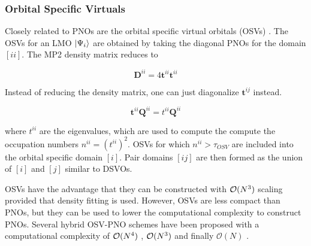 

\subsubsection*{Orbital Specific Virtuals}

Closely related to PNOs are the orbital specific virtual orbitals (OSVs) \cite{Yan2011}. The OSVs for an LMO $\ket{\Psi_i}$ are obtained by taking the diagonal PNOs for the domain $[ii]$. The MP2 density matrix reduces to

\begin{equation}
\mathbf{D}^{ii} = 4 \mathbf{t}^{ii} \mathbf{t}^{ii}
\end{equation}

\noindent Instead of reducing the density matrix, one can just diagonalize $\mathbf{t}^{ij}$ instead. 

\begin{equation}
\mathbf{t}^{ii} \mathbf{Q}^{ii} = t^{ii} \mathbf{Q}^{ii}
\end{equation}

\noindent where $t^{ii}$ are the eigenvalues, which are used to compute the compute the occupation numbers $n^{ii} = \left( t^{ii} \right)^2$. OSVs for which $n^{ii} > \tau_{OSV}$ are included into the orbital specific domain $[i]$. Pair domains $[ij]$ are then formed as the union of $[i]$ and $[j]$ similar to DSVOs. 

OSVs have the advantage that they can be constructed with $\mathcal{O}(N^{3})$ scaling provided that density fitting is used. However, OSVs are less compact than PNOs, but they can be used to lower the computational complexity to construct PNOs. Several hybrid OSV-PNO schemes have been proposed with a computational complexity of $\mathcal{O}(N^{4})$ \cite{Kra2012}, $\mathcal{O}(N^{3})$ \cite{Sch2013} and finally $\mathcal{O}(N)$ \cite{Rip2013}.




